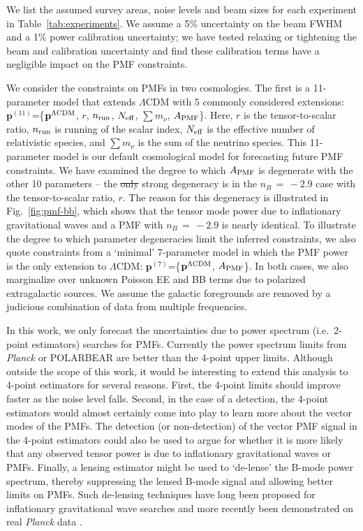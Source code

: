 \documentclass[apj]{emulateapj}
\newcommand{\apmf}{\ensuremath{A_{\rm PMF}}}
\newcommand{\lcdm}{\ensuremath{\Lambda}CDM}
\newcommand{\nrun}{\ensuremath{n_{\rm run}}}
\newcommand{\neff}{\ensuremath{N_{\rm eff}}}
\newcommand{\mnu}{\ensuremath{\sum m_\nu}}
\newcommand{\planck}{{\sl Planck}}
\newcommand{\pb}{POLARBEAR}
\begin{document}
We list the assumed survey areas, noise levels and beam sizes for each experiment in Table~\ref{tab:experiments}. 
We  assume a 5\% uncertainty on the beam FWHM and a 1\% power calibration uncertainty; we have tested relaxing or tightening the beam and calibration uncertainty and find these calibration terms have a negligible impact on the PMF constraints. 


We consider the constraints on PMFs in two cosmologies. 
The first is a 11-parameter model that extends \lcdm{} with 5 commonly considered extensions:  $\textbf{p}^{(11)}$=\{$\textbf{p}^{\rm{\lcdm{}}}$, $r$, \nrun{}, \neff{}, \mnu{}, \apmf\}. 
Here, $r$ is the tensor-to-scalar ratio, \nrun{} is running of the scalar index, \neff{} is the effective number of relativistic species, and \mnu{} is the sum of the neutrino species. 
This 11-parameter model is our default cosmological model for forecasting future PMF constraints. 
We have examined the degree to which \apmf{} is degenerate with the other 10 parameters -- the \st{only} strong degeneracy is in the $n_B\,=\,-2.9$ case with the tensor-to-scalar ratio, $r$. 
The reason for this degeneracy is illustrated in Fig.~\ref{fig:pmf-bb}, which shows that the tensor mode power due to inflationary gravitational waves and a PMF with $n_B\,=\,-2.9$ is nearly identical. 
To illustrate the degree to which parameter degeneracies limit the inferred constraints,  we also quote constraints from a `minimal' 7-parameter model in which the PMF power is the only extension to \lcdm{}:  $\textbf{p}^{(7)}$=\{$\textbf{p}^{\rm{\lcdm{}}}$, \apmf\}.
In both cases, we also marginalize over unknown Poisson EE and BB  terms due to polarized extragalactic sources. 
We assume the galactic foregrounds are removed by a judicious combination of data from multiple frequencies. 


In this work, we only forecast the uncertainties due to power spectrum (i.e.~2-point estimators) searches for PMFs. 
Currently the power spectrum limits from \planck{} or \pb{} are better than the 4-point upper limits. 
Although outside the scope of this work, it would be interesting to extend this analysis to 4-point estimators for several reasons. 
First, the 4-point limits should improve faster as the noise level falls. 
Second, in the case of a detection, the 4-point estimators would almost certainly come into play to learn more about the vector modes of the PMFs. 
The detection (or non-detection) of the vector PMF signal in the 4-point estimators could also be used to argue for whether it is more likely that any observed tensor power is due to  inflationary gravitational waves or  PMFs. 
Finally, a lensing estimator might be used to `de-lense' the B-mode power spectrum, thereby suppressing the lensed B-mode signal and allowing better limits on PMFs. 
Such de-lensing techniques have long been proposed for inflationary gravitational wave searches \citep[e.g.][]{knox02,kesden02,seljak04a,simard15} and more recently been demonstrated on real \planck{} data \citep{larsen16}. 
\end{document}
